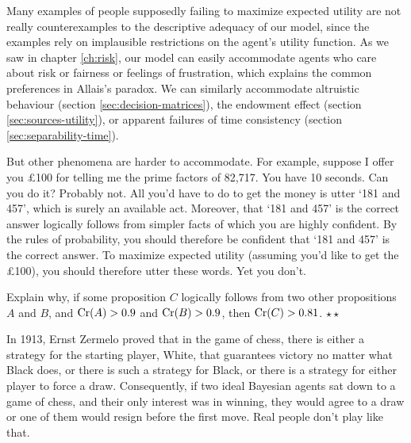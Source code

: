 Many examples of people supposedly failing to maximize expected
utility are not really counterexamples to the descriptive adequacy of
our model, since the examples rely on implausible restrictions on the
agent's utility function. As we saw in chapter \ref{ch:risk}, our
model can easily accommodate agents who care about risk or fairness or
feelings of frustration, which explains the common preferences in
Allais's paradox. We can similarly accommodate altruistic behaviour
(section \ref{sec:decision-matrices}), the endowment effect (section
\ref{sec:sources-utility}), or apparent failures of time consistency
(section \ref{sec:separability-time}).


But other phenomena are harder to accommodate. For example, suppose I
offer you £100 for telling me the prime factors of 82,717. You have 10
seconds. Can you do it? Probably not. All you'd have to do to get the
money is utter `181 and 457', which is surely an available
act. Moreover, that `181 and 457' is the correct answer logically
follows from simpler facts of which you are highly confident. By the
rules of probability, you should therefore be confident that `181 and
457' is the correct answer. To maximize expected utility (assuming
you'd like to get the £100), you should therefore utter these
words. Yet you don't.

\begin{exercise}
  Explain why, if some proposition $C$ logically follows from two
  other propositions $A$ and $B$, and $\text{Cr}(A) > 0.9$ and $\text{Cr}(B) >
  0.9$, then $\text{Cr}(C) > 0.81$. $\star\star$
\end{exercise}

In 1913, Ernst Zermelo proved that in the game of chess, there is
either a strategy for the starting player, White, that guarantees
victory no matter what Black does, or there is such a strategy for
Black, or there is a strategy for either player to force a
draw. Consequently, if two ideal Bayesian agents sat down to a game of
chess, and their only interest was in winning, they would agree to a
draw or one of them would resign before the first move. Real people
don't play like that.

